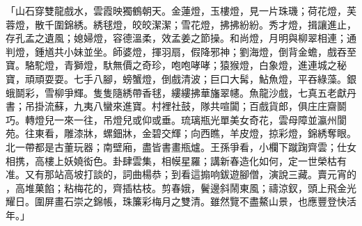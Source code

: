 \begin{showcontents}{}
「山石穿雙龍戲水，雲霞映獨鶴朝天。金蓮燈，玉樓燈，見一片珠璣；荷花燈，芙蓉燈，散千圍錦綉。綉毬燈，皎皎潔潔；雪花燈，拂拂紛紛。秀才燈，揖讓進止，存孔孟之遺風；媳婦燈，容德溫柔，效孟姜之節操。和尚燈，月明與柳翠相連；通判燈，鍾馗共小妹並坐。師婆燈，揮羽扇，假降邪神；劉海燈，倒背金蟾，戲吞至寶。駱駝燈，青獅燈，馱無價之奇珍，咆咆哮哮；猿猴燈，白象燈，進連城之秘寶，頑頑耍耍。七手八腳，螃蟹燈，倒戲清波；巨口大髯，鮎魚燈，平吞綠藻。銀蛾鬬彩，雪柳爭輝。隻隻隨綉帶香毬，縷縷拂華旛翠幰。魚龍沙戲，七真五老獻丹書；吊掛流蘇，九夷八蠻來進寶。村裡社鼓，隊共喧闐；百戲貨郎，俱庄庄齋鬬巧。轉燈兒一來一往，吊燈兒或仰或垂。琉璃瓶光單美女奇花，雲母障並瀛州閬苑。往東看，雕漆牀，螺鈿牀，金碧交輝；向西瞧，羊皮燈，掠彩燈，錦綉奪眼。北一帶都是古董玩器；南壁廂，盡皆書畫瓶爐。王孫爭看，小欄下蹴踘齊雲；仕女相携，高樓上妖嬈衒色。卦肆雲集，相幙星羅；講新春造化如何，定一世榮枯有准。又有那站高坡打談的，詞曲楊恭；到看這搧响鈸遊腳僧，演說三藏。賣元宵的 ，高堆菓餡；粘梅花的，齊插枯枝。剪春娥，鬢邊斜鬧東風；禱涼釵，頭上飛金光耀日。圍屏畫石崇之錦帳，珠簾彩梅月之雙清。雖然覽不盡鰲山景，也應豐登快活年。」


\end{showcontents}
